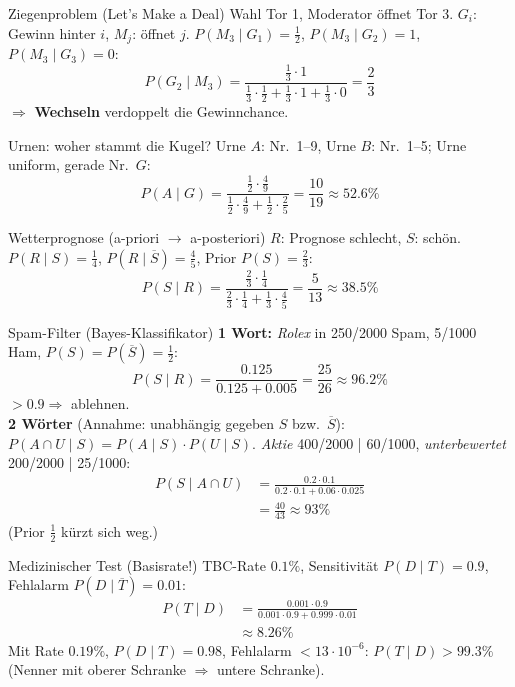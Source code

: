 \documentclass[a4paper, fontsize=7pt]{scrartcl}
\begin{document}
\begin{subbox}{Ziegenproblem (Let's Make a Deal)}
Wahl Tor 1, Moderator öffnet Tor 3. $G_i$: Gewinn hinter $i$,
$M_j$: öffnet $j$. $P(M_3 \mid G_1) = \frac{1}{2}$,
$P(M_3 \mid G_2) = 1$, $P(M_3 \mid G_3) = 0$:
$$P(G_2 \mid M_3) = \frac{\frac{1}{3} \cdot 1}{\frac{1}{3}\cdot\frac{1}{2}
+ \frac{1}{3} \cdot 1 + \frac{1}{3} \cdot 0} = \frac{2}{3}$$
$\Rightarrow$ \textbf{Wechseln} verdoppelt die Gewinnchance.
\end{subbox}

\begin{subbox}{Urnen: woher stammt die Kugel?}
Urne $A$: Nr.\ 1--9, Urne $B$: Nr.\ 1--5; Urne uniform, gerade Nr.\ $G$:
$$P(A \mid G) = \frac{\frac{1}{2}\cdot\frac{4}{9}}{\frac{1}{2}\cdot\frac{4}{9}
+ \frac{1}{2}\cdot\frac{2}{5}} = \frac{10}{19} \approx 52.6\%$$
\end{subbox}

\begin{subbox}{Wetterprognose (a-priori $\to$ a-posteriori)}
$R$: Prognose schlecht, $S$: schön. $P(R \mid S) = \frac{1}{4}$,
$P(R \mid \overline{S}) = \frac{4}{5}$, Prior $P(S) = \frac{2}{3}$:
$$P(S \mid R) = \frac{\frac{2}{3}\cdot\frac{1}{4}}{\frac{2}{3}\cdot\frac{1}{4}
+ \frac{1}{3}\cdot\frac{4}{5}} = \frac{5}{13} \approx 38.5\%$$
\end{subbox}

\begin{subbox}{Spam-Filter (Bayes-Klassifikator)}
\textbf{1 Wort:} \emph{Rolex} in 250/2000 Spam, 5/1000 Ham,
$P(S) = P(\overline{S}) = \frac{1}{2}$:
$$P(S \mid R) = \frac{0.125}{0.125 + 0.005} = \frac{25}{26} \approx 96.2\%$$
$> 0.9 \Rightarrow$ ablehnen.\\
\textbf{2 Wörter} (Annahme: unabhängig gegeben $S$ bzw.\ $\overline{S}$):
$P(A \cap U \mid S) = P(A \mid S) \cdot P(U \mid S)$.
\emph{Aktie} 400/2000 | 60/1000, \emph{unterbewertet} 200/2000 | 25/1000:
\begin{align*}
P(S \mid A \cap U) &= \frac{0.2 \cdot 0.1}{0.2 \cdot 0.1 + 0.06 \cdot 0.025}\\
&= \frac{40}{43} \approx 93\%
\end{align*}
(Prior $\frac{1}{2}$ kürzt sich weg.)
\end{subbox}

\begin{subbox}{Medizinischer Test (Basisrate!)}
TBC-Rate $0.1\%$, Sensitivität $P(D \mid T) = 0.9$,
Fehlalarm $P(D \mid \overline{T}) = 0.01$:
\begin{align*}
P(T \mid D) &= \frac{0.001 \cdot 0.9}{0.001 \cdot 0.9 + 0.999 \cdot 0.01}\\
&\approx 8.26\%
\end{align*}
Mit Rate $0.19\%$, $P(D \mid T) = 0.98$, Fehlalarm $< 13\cdot10^{-6}$:
$P(T \mid D) > 99.3\%$ (Nenner mit oberer Schranke $\Rightarrow$ untere
Schranke).
\end{subbox}
\end{document}
